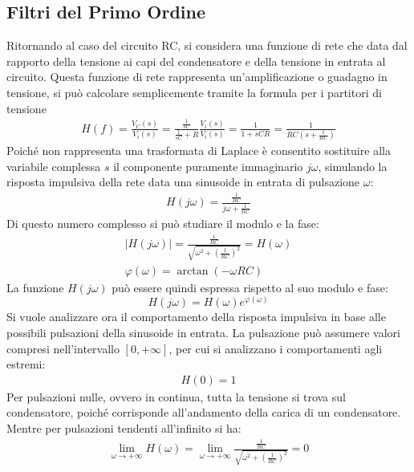 \documentclass{article}
\numberwithin{equation}{subsection}
\begin{document}
\subsection{Filtri del Primo Ordine}

Ritornando al caso del circuito RC, si considera una funzione di rete che data dal rapporto della tensione ai capi del condensatore e della tensione in entrata al circuito. 
Questa funzione di rete rappresenta un'amplificazione o guadagno in tensione, si può calcolare semplicemente tramite la formula per i partitori di tensione
\begin{gather*}
    H(f)=\displaystyle\frac{V_C(s)}{V_{i}(s)}=\frac{\displaystyle\frac{1}{sC}}{\frac{1}{sC}+R}\frac{V_{i}(s)}{V_i(s)}=\frac{1}{1+sCR}=\frac{1}{RC\left(s+\displaystyle\frac{1}{RC}\right)}
\end{gather*}
Poiché non rappresenta una trasformata di Laplace è consentito sostituire alla variabile complessa $s$ il componente puramente immaginario $j\omega$, simulando la risposta 
impulsiva della rete data una sinusoide in entrata di pulsazione $\omega$:
\begin{gather*}
    H(j\omega)=\displaystyle\frac{\displaystyle\frac{1}{RC}}{j\omega+\displaystyle\frac{1}{RC}}
\end{gather*}
Di questo numero complesso si può studiare il modulo e la fase:
\begin{gather*}
    |H(j\omega)|=\displaystyle\frac{\displaystyle\frac{1}{RC}}{\sqrt{\displaystyle\omega^2+\left(\frac{1}{RC}\right)^2}}=H(\omega)\\
    \varphi(\omega)=\arctan\left(-\omega RC\right)
\end{gather*}
La funzione $H(j\omega)$ può essere quindi espressa rispetto al suo modulo e fase:
\begin{equation}
    H(j\omega)=H(\omega)e^{\varphi(\omega)}
\end{equation}
Si vuole analizzare ora il comportamento della risposta impulsiva in base alle possibili pulsazioni della sinusoide in entrata. 
La pulsazione può assumere valori compresi nell'intervallo $[0,+\infty]$, per cui si analizzano i comportamenti agli estremi:
\begin{gather*}
    H(0)=1
\end{gather*}
Per pulsazioni nulle, ovvero in continua, tutta la tensione si trova sul condensatore, poiché corrisponde all'andamento della carica di un condensatore. 
Mentre per pulsazioni tendenti all'infinito si ha:
\begin{gather*}
    \lim_{\omega\to+\infty}H(\omega)=\lim_{\omega\to+\infty}\displaystyle\frac{\displaystyle\frac{1}{RC}}{\sqrt{\displaystyle\omega^2+\left(\frac{1}{RC}\right)^2}}=0
\end{gather*}
\end{document}
